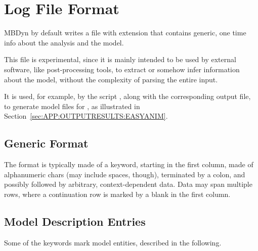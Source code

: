 %
%
%
%
%
% 
%
%

\chapter{Log File Format}
\label{sec:APP:LOGFILE}

MBDyn by default writes a file with  extension that contains
generic, one time info about the analysis and the model.

This file is experimental, since it is mainly intended to be used
by external software, like post-processing tools, to extract 
or somehow infer information about the model, without the complexity
of parsing the entire input.

It is used, for example, by the script , along
with the corresponding  output file, to generate model files
for , as illustrated
in Section~\ref{sec:APP:OUTPUTRESULTS:EASYANIM}.

\section{Generic Format}
The format is typically made of a keyword, starting in the first column,
made of alphanumeric chars (may include spaces, though), 
terminated by a colon, and possibly followed by arbitrary, 
context-dependent data.
Data may span multiple rows, where a continuation row is marked 
by a blank in the first column.

\section{Model Description Entries}
Some of the keywords mark model entities, described in the following.

